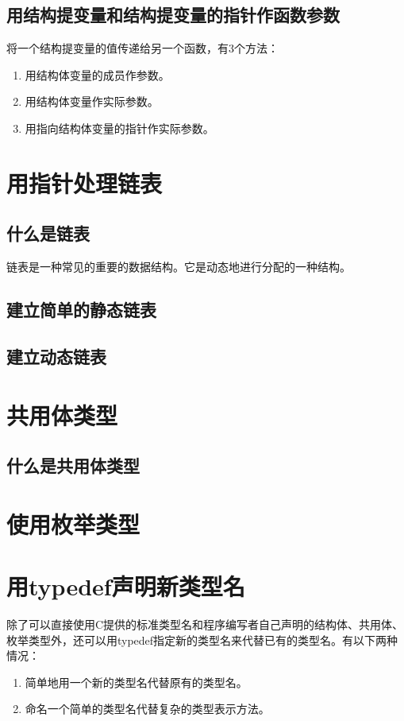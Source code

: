 \subsection{用结构提变量和结构提变量的指针作函数参数}
将一个结构提变量的值传递给另一个函数，有3个方法：
\begin{enumerate}
	\item 用结构体变量的成员作参数。
	\item 用结构体变量作实际参数。
	\item 用指向结构体变量的指针作实际参数。
\end{enumerate}
\section{用指针处理链表}
\subsection{什么是链表}
链表是一种常见的重要的数据结构。它是动态地进行分配的一种结构。
\subsection{建立简单的静态链表}
\subsection{建立动态链表}
\section{共用体类型}
\subsection{什么是共用体类型}
\section{使用枚举类型}
\section{用typedef声明新类型名}
除了可以直接使用C提供的标准类型名和程序编写者自己声明的结构体、共用体、枚举类型外，还可以用typedef指定新的类型名来代替已有的类型名。有以下两种情况：
\begin{enumerate}
	\item 简单地用一个新的类型名代替原有的类型名。
	\item 命名一个简单的类型名代替复杂的类型表示方法。
\end{enumerate}
